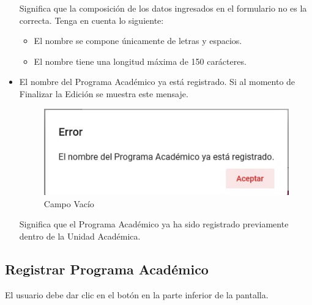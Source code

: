 \begin{itemize}
                	Significa que la composición de los datos ingresados en el formulario no es la correcta. Tenga en cuenta lo siguiente:

                	\begin{itemize}
                		\item El nombre se compone  únicamente de letras y espacios.

                        \item El nombre tiene una longitud máxima de 150 carácteres.
                	\end{itemize}

                \item El nombre del Programa Académico ya está registrado.
                    Si al momento de Finalizar la Edición se muestra este mensaje.

                     \begin{figure}[H]
                    \centering
                    \hypertarget{vacio}{\includegraphics[width=0.7\linewidth]{images/SP3/Yareg}}
                    \caption{Campo Vacío}
                    \label{vacio}
                    \end{figure}

                    Significa que el Programa Académico ya ha sido registrado previamente dentro de la Unidad Académica.



            \end{itemize}
        \subsection{Registrar Programa Académico}

            El usuario debe dar clic en el botón \IUbutton{+} en la parte inferior de la pantalla.

